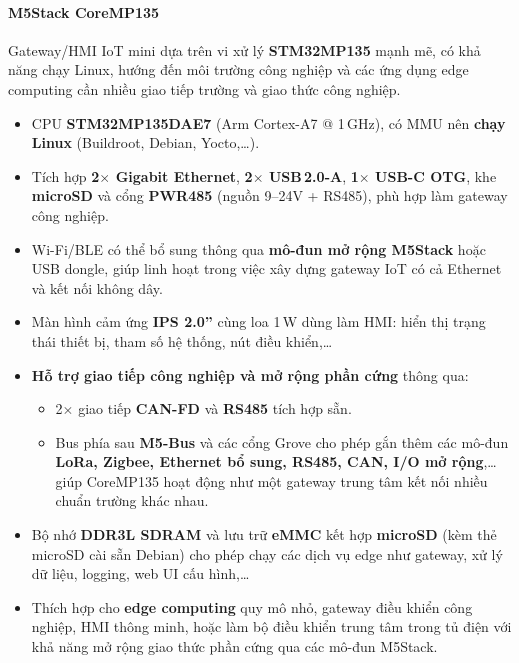                 \paragraph*{M5Stack CoreMP135}
                    Gateway/HMI IoT mini dựa trên vi xử lý \textbf{STM32MP135} mạnh mẽ, có khả năng chạy Linux, hướng đến môi trường công nghiệp và các ứng dụng edge computing cần nhiều giao tiếp trường và giao thức công nghiệp.
                    \begin{itemize}
                        \item CPU \textbf{STM32MP135DAE7} (Arm Cortex-A7 @ 1\,GHz), có MMU nên \textbf{chạy Linux} (Buildroot, Debian, Yocto,\dots).
                        \item Tích hợp \textbf{2$\times$ Gigabit Ethernet}, \textbf{2$\times$ USB\,2.0-A}, \textbf{1$\times$ USB-C OTG}, khe \textbf{microSD} và cổng \textbf{PWR485} (nguồn 9--24V + RS485), phù hợp làm gateway công nghiệp.
                        \item Wi-Fi/BLE có thể bổ sung thông qua \textbf{mô-đun mở rộng M5Stack} hoặc USB dongle, giúp linh hoạt trong việc xây dựng gateway IoT có cả Ethernet và kết nối không dây.
                        \item Màn hình cảm ứng \textbf{IPS 2.0''} cùng loa 1\,W dùng làm HMI: hiển thị trạng thái thiết bị, tham số hệ thống, nút điều khiển,\dots
                        \item \textbf{Hỗ trợ giao tiếp công nghiệp và mở rộng phần cứng} thông qua:
                        \begin{itemize}
                            \item 2$\times$ giao tiếp \textbf{CAN-FD} và \textbf{RS485} tích hợp sẵn.
                            \item Bus phía sau \textbf{M5-Bus} và các cổng Grove cho phép gắn thêm các mô-đun \textbf{LoRa, Zigbee, Ethernet bổ sung, RS485, CAN, I/O mở rộng},\dots giúp CoreMP135 hoạt động như một gateway trung tâm kết nối nhiều chuẩn trường khác nhau.
                        \end{itemize}
                        \item Bộ nhớ \textbf{DDR3L SDRAM} và lưu trữ \textbf{eMMC} kết hợp \textbf{microSD} (kèm thẻ microSD cài sẵn Debian) cho phép chạy các dịch vụ edge như gateway, xử lý dữ liệu, logging, web UI cấu hình,\dots
                        \item Thích hợp cho \textbf{edge computing} quy mô nhỏ, gateway điều khiển công nghiệp, HMI thông minh, hoặc làm bộ điều khiển trung tâm trong tủ điện với khả năng mở rộng giao thức phần cứng qua các mô-đun M5Stack.
                    \end{itemize}
